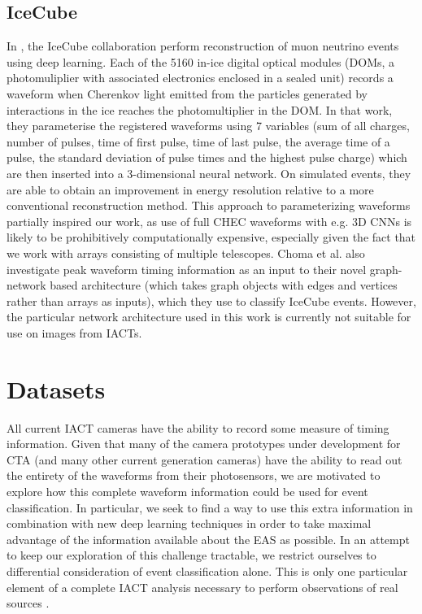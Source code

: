 \subsection{IceCube}
In \cite{icecube1}, the IceCube collaboration perform reconstruction of muon neutrino events using deep learning. Each of the 5160 in-ice digital optical modules (DOMs, a photomuliplier with associated electronics enclosed in a sealed unit) records a waveform when Cherenkov light emitted from the particles generated by interactions in the ice reaches the photomultiplier in the DOM. In that work, they parameterise the registered waveforms using 7 variables (sum of all charges, number of pulses, time of first pulse, time of last pulse, the average time of a pulse, the standard deviation of pulse times and the highest pulse charge) which are then inserted into a 3-dimensional neural network. On simulated events, they are able to obtain an improvement in energy resolution relative to a more conventional reconstruction method. This approach to parameterizing waveforms partially inspired our work, as use of full CHEC waveforms with e.g. 3D CNNs is likely to be prohibitively computationally expensive, especially given the fact that we work with arrays consisting of multiple telescopes. Choma et al. \cite{icecubegraph} also investigate peak waveform timing information as an input to their novel graph-network based architecture (which takes graph objects with edges and vertices rather than arrays as inputs), which they use to classify IceCube events. However, the particular network architecture used in this work is currently not suitable for use on images from IACTs.

\section{Datasets} \label{Datasets}

All current IACT cameras have the ability to record some measure of timing information. Given that many of the camera prototypes under development for CTA (and many other current generation cameras) have the ability to read out the entirety of the waveforms from their photosensors, we are motivated to explore how this complete waveform information could be used for event classification. In particular, we seek to find a way to use this extra information in combination with new deep learning techniques in order to take maximal advantage of the information available about the EAS as possible. In an attempt to keep our exploration of this challenge tractable, we restrict ourselves to differential consideration of event classification alone. This is only one particular element of a complete IACT analysis necessary to perform observations of real sources \cite{Berge07}\cite{LiMa}.

